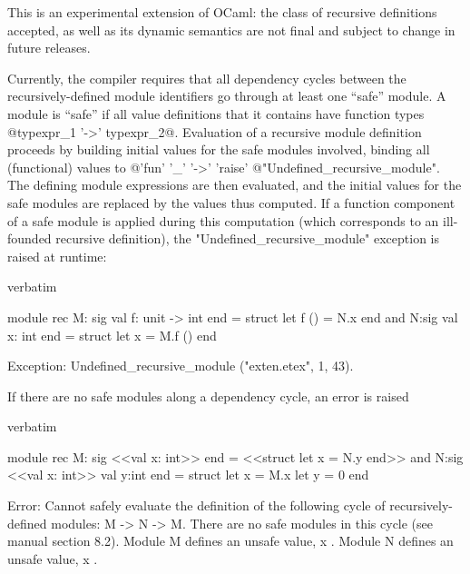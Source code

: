 This is an experimental extension of OCaml: the class of
recursive definitions accepted, as well as its dynamic semantics are
not final and subject to change in future releases.

Currently, the compiler requires that all dependency cycles between
the recursively-defined module identifiers go through at least one
``safe'' module.  A module is ``safe'' if all value definitions that
it contains have function types @typexpr_1 '->' typexpr_2@.  Evaluation of a
recursive module definition proceeds by building initial values for
the safe modules involved, binding all (functional) values to
@'fun' '_' '->' 'raise' @"Undefined_recursive_module".  The defining
module expressions are then evaluated, and the initial values
for the safe modules are replaced by the values thus computed.  If a
function component of a safe module is applied during this computation
(which corresponds to an ill-founded recursive definition), the
"Undefined_recursive_module" exception is raised at runtime:

\begin{camlexample}{verbatim}
\begin{caml}
\begin{camlinput}
module rec M: sig val f: unit -> int end = struct let f () = N.x end
and N:sig val x: int end = struct let x = M.f () end
\end{camlinput}
\begin{camloutput}
Exception: Undefined_recursive_module ("exten.etex", 1, 43).
\end{camloutput}
\end{caml}
\end{camlexample}

If there are no safe modules along a dependency cycle, an error is raised

\begin{camlexample}{verbatim}
\begin{caml}
\begin{camlinput}
module rec M: sig <<val x: int>> end = <<struct let x = N.y end>>
and N:sig <<val x: int>> val y:int end = struct let x = M.x let y = 0 end
\end{camlinput}
\begin{camlerror}
Error: Cannot safely evaluate the definition of the following cycle
       of recursively-defined modules: M -> N -> M.
       There are no safe modules in this cycle (see manual section 8.2).
  Module M defines an unsafe value, x .
  Module N defines an unsafe value, x .
\end{camlerror}
\end{caml}
\end{camlexample}

